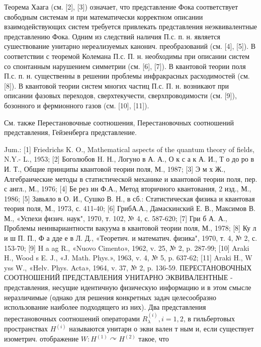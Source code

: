 \documentclass[10pt]{article}
\begin{document}
Теорема Хаага (см. [2], [3]) означает, что представление Фока соответствует свободным системам и при математически корректном описании взаимодействующих систем требуется привлекать представления неэквивалентные представлению Фока. Одним из следствий наличия П.с. п. н. является сушествование унитарно нереализуемых канонич. преобразований (см. [4], [5]). В соответствии с теоремой Колемана П.с. П. н. необходимы при описании систем со спонтанным нарушением симметрии (см. [6], [7]). В квантовой теории поля П.с. п. н. существенны в решении проблемы инфракрасных расходимостей (см. [8]). В квантовой теории систем многих частиц П.с. П. н. возникают при описании фазовых переходов, сверхтекучести, сверхпроводимости (см. [9]), бозонного и фермионного газов (см. [10], [11]).



См. также Перестановочные соотношения, Перестановочных соотношений представления, Гейзенберга представление.



Jum.: [1] Friedrichs K. O., Mathematical aspects of the quantum theory of fields, N.Y.- L., 1953; [2] Боголюбов H. Н., Логуно в А. А., О к с а к А. И., Т о до ро в И. Т., Общие принципы квантовой теории поля, М., 1987; [3] Э м х Ж., Алгебраические методы в статистической механике и квантовой теории поля, пер. с англ., М., 1976; [4] Бе рез ин Ф.А., Метод вторичного квантования, 2 изд., М., 1986; [5] Завьяло в О. И., Сушко В. Н., в сб.: Статистическая физика и квантовая теория поля, М., 1973, с. 411-40; [6] ГрибА.А., Дамаскинский Е. В., Максимов В. М., «Успехи физич. наук", 1970, т. 102, № 4, с. 587-620; [7] Гри б А. А., Проблемы неинвариантности вакуума в квантовой теории поля, М., 1978; [8] Ку л и ш П. П., Ф а дде е в Л. Д., «Теоретич. и математич. физика", 1970, т. 4, № 2, с. 153-70; [9] H a ag R., «Nuovo Cimento», 1962, v. 25, № 2, p. 287-99; [10] Araki H., Wood s E. J., «J. Math. Phys.», 1963, v. 4, № 5, p. 637-62; [11] Araki H., W yss W., «Helv. Phys. Acta», 1964, v. 37, № 2, p. 136-59. ПЕРЕСТАНОВОЧНЫХ СООТНОШЕНИЙ ПРЕДСТАВЛЕНИЯ УНИТАРНО ЭКВИВАЛЕНТНЫЕ - представления, несущие идентичную физическую информацию и в этом смысле неразличимые (однако для решения конкретных задач целесообразно использование наиболее подходящего из них). Два представления перестановочных соотношений операторами $R_{\lambda}^{(i)}, i=1,2$, в гильбертовых пространствах $H^{(i)}$ называются унитарн о экви вален т ным и, если существует изометрич. отображение $W: H^{(1)} \curvearrowright H^{(2)}$ такое, что
\end{document}
